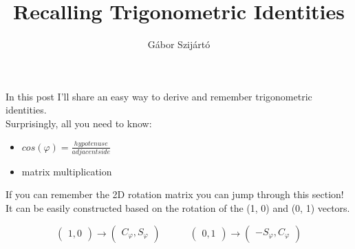 \documentclass[12pt, a4paper, twoside]{article}
\author{Gábor Szijártó}
\title{Recalling Trigonometric Identities}
\date{}
\begin{document}
\srdocsimple

In this post I'll share an easy way to derive and remember trigonometric identities.\\

Surprisingly, all you need to know:
\begin{itemize}
\item $cos(\varphi) = \frac{hypotenuse}{adjacent side}$
\item matrix multiplication
\end{itemize}

If you can remember the 2D rotation matrix you can jump through this section!\\
It can be easily constructed based on the rotation of the (1, 0) and (0, 1) vectors.

\begin{equation}
	\begin{pmatrix}1, 0\end{pmatrix} \to \begin{pmatrix}C_{\varphi}, S_{\varphi}\end{pmatrix}
	\quad \quad \quad
	\begin{pmatrix}0, 1\end{pmatrix} \to \begin{pmatrix}-S_{\varphi}, C_{\varphi} \end{pmatrix}
\end{equation}
\end{document}
